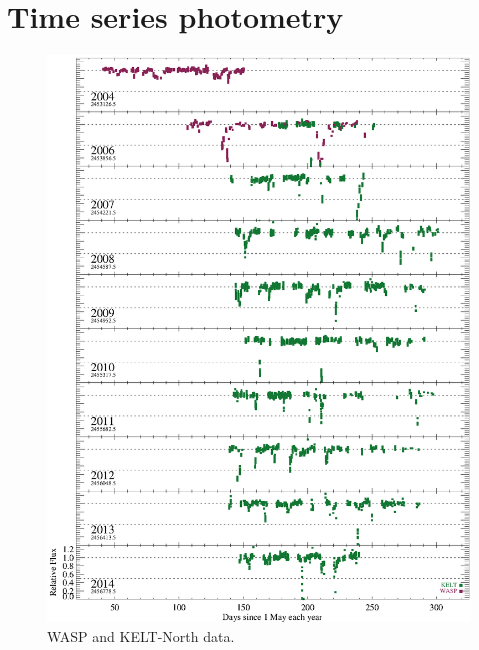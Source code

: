 \documentclass[useAMS,usenatbib,usegraphicx]{mn2e}
\begin{document}
\section{Time series photometry}\label{s:data}

\begin{figure}
  \begin{center}
    \hspace{-0.5cm} \includegraphics[width=\textwidth]{figs/yearly-2004.eps}
    \caption{WASP and KELT-North data.}\label{fig:waspkelt}
  \end{center}
\end{figure}
\end{document}
